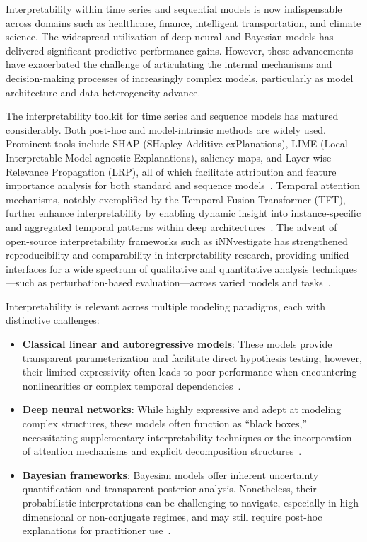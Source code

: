 Interpretability within time series and sequential models is now indispensable across domains such as healthcare, finance, intelligent transportation, and climate science. The widespread utilization of deep neural and Bayesian models has delivered significant predictive performance gains. However, these advancements have exacerbated the challenge of articulating the internal mechanisms and decision-making processes of increasingly complex models, particularly as model architecture and data heterogeneity advance.

The interpretability toolkit for time series and sequence models has matured considerably. Both post-hoc and model-intrinsic methods are widely used. Prominent tools include SHAP (SHapley Additive exPlanations), LIME (Local Interpretable Model-agnostic Explanations), saliency maps, and Layer-wise Relevance Propagation (LRP), all of which facilitate attribution and feature importance analysis for both standard and sequence models~\cite{ref3}\cite{ref11}\cite{ref30}\cite{ref31}\cite{ref55}. Temporal attention mechanisms, notably exemplified by the Temporal Fusion Transformer (TFT), further enhance interpretability by enabling dynamic insight into instance-specific and aggregated temporal patterns within deep architectures~\cite{ref3}\cite{ref30}\cite{ref31}. The advent of open-source interpretability frameworks such as iNNvestigate has strengthened reproducibility and comparability in interpretability research, providing unified interfaces for a wide spectrum of qualitative and quantitative analysis techniques—such as perturbation-based evaluation—across varied models and tasks~\cite{ref55}.

Interpretability is relevant across multiple modeling paradigms, each with distinctive challenges:

\begin{itemize}
    \item \textbf{Classical linear and autoregressive models}: These models provide transparent parameterization and facilitate direct hypothesis testing; however, their limited expressivity often leads to poor performance when encountering nonlinearities or complex temporal dependencies~\cite{ref26}\cite{ref27}\cite{ref28}\cite{ref29}.
    \item \textbf{Deep neural networks}: While highly expressive and adept at modeling complex structures, these models often function as ``black boxes,'' necessitating supplementary interpretability techniques or the incorporation of attention mechanisms and explicit decomposition structures~\cite{ref31}\cite{ref47}\cite{ref52}\cite{ref53}\cite{ref54}\cite{ref62}\cite{ref64}\cite{ref67}\cite{ref79}\cite{ref86}.
    \item \textbf{Bayesian frameworks}: Bayesian models offer inherent uncertainty quantification and transparent posterior analysis. Nonetheless, their probabilistic interpretations can be challenging to navigate, especially in high-dimensional or non-conjugate regimes, and may still require post-hoc explanations for practitioner use~\cite{ref28}\cite{ref29}\cite{ref53}\cite{ref54}\cite{ref64}\cite{ref86}.
\end{itemize}

